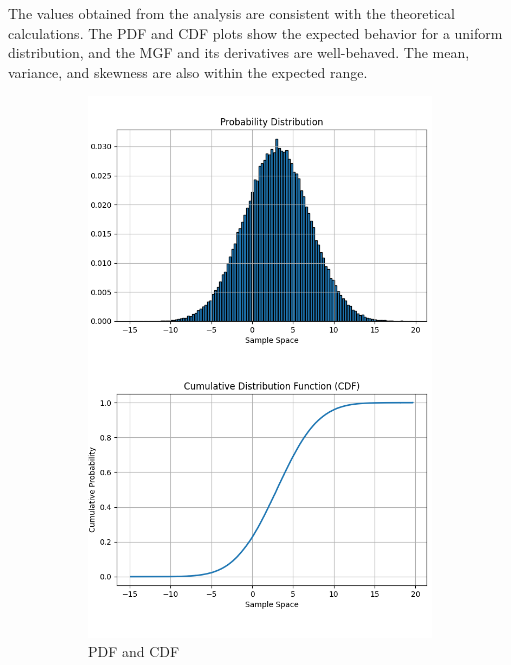 \documentclass{article}
\begin{document}
The values obtained from the analysis are consistent with the theoretical calculations. The PDF and CDF plots show the expected behavior for a uniform distribution, and the MGF and its derivatives are well-behaved. The mean, variance, and skewness are also within the expected range.
\newpage

\begin{figure}[H]
  \centering
  \begin{subfigure}{0.45\textwidth}
    \centering
    \includegraphics[width=\linewidth]{results/section1/c1(1).png}
    \caption{PDF and CDF}
  \end{subfigure}
  \hfill
  \begin{subfigure}{0.45\textwidth}
    \centering

\end{subfigure}
\end{figure}
\end{document}
